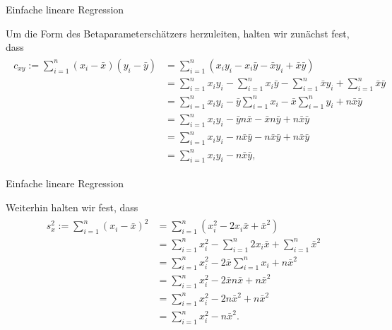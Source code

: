 \documentclass[
  8pt,
  ignorenonframetext,
]{beamer}
\begin{document}
\begin{frame}{Einfache lineare Regression}
\protect\hypertarget{einfache-lineare-regression-1}{}
\footnotesize

Um die Form des Betaparameterschätzers herzuleiten, halten wir zunächst
fest, dass \tiny \begin{align}
\begin{split}
c_{xy}
:= \sum_{i=1}^n (x_i - \bar{x})(y_i - \bar{y})
& = \sum_{i=1}^n (x_iy_i - x_i\bar{y} - \bar{x}y_i + \bar{x}\bar{y}) \\
& = \sum_{i=1}^n x_iy_i
  - \sum_{i=1}^n x_i\bar{y}
  - \sum_{i=1}^n \bar{x}y_i
  + \sum_{i=1}^n \bar{x}\bar{y} \\
& = \sum_{i=1}^n x_iy_i
  - \bar{y} \sum_{i=1}^n x_i
  - \bar{x}\sum_{i=1}^n y_i
  + n \bar{x}\bar{y} \\
& = \sum_{i=1}^n x_iy_i
  - \bar{y}n\bar{x}
  - \bar{x}n\bar{y}
  + n\bar{x}\bar{y} \\
  & = \sum_{i=1}^n x_iy_i
  - n\bar{x}\bar{y}
  - n\bar{x}\bar{y}
  + n\bar{x}\bar{y} \\
& = \sum_{i=1}^n x_i y_i  - n \bar{x}\bar{y},
\end{split}
\end{align}
\end{frame}

\begin{frame}{Einfache lineare Regression}
\protect\hypertarget{einfache-lineare-regression-2}{}
\footnotesize

Weiterhin halten wir fest, dass \tiny \begin{align}
\begin{split}
s_x^2
:= \sum_{i=1}^n (x_i - \bar{x})^2
& = \sum_{i=1}^n (x_i^2 - 2x_i\bar{x}  + \bar{x}^2) \\
& = \sum_{i=1}^n x_i^2 - \sum_{i=1}^n 2x_i\bar{x}  + \sum_{i=1}^n \bar{x}^2 \\
& = \sum_{i=1}^n x_i^2 - 2\bar{x}\sum_{i=1}^n x_i  + n\bar{x}^2 \\
& = \sum_{i=1}^n x_i^2 - 2\bar{x}n\bar{x}  + n\bar{x}^2 \\
& = \sum_{i=1}^n x_i^2 - 2n\bar{x}^2 + n\bar{x}^2 \\
& = \sum_{i=1}^n x_i^2 - n\bar{x}^2.\\
\end{split}
\end{align}
\end{frame}
\end{document}
